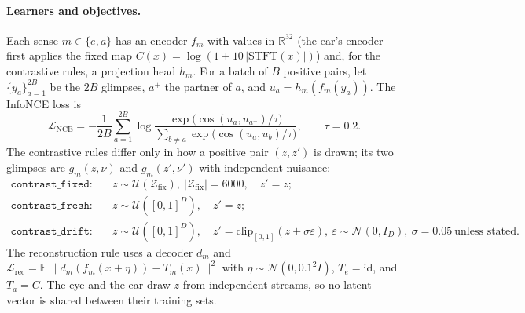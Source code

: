 \documentclass[11pt]{article}
\begin{document}
\paragraph{Learners and objectives.} Each sense $m\in\{e,a\}$ has an encoder $f_m$ with values in $\mathbb R^{32}$ (the ear's encoder first applies the fixed map $C(x)=\log(1+10\,\lvert\mathrm{STFT}(x)\rvert)$) and, for the contrastive rules, a projection head $h_m$. For a batch of $B$ positive pairs, let $\{y_a\}_{a=1}^{2B}$ be the $2B$ glimpses, $a^+$ the partner of $a$, and $u_a=h_m(f_m(y_a))$. The InfoNCE loss is
\begin{equation}
  \mathcal L_{\mathrm{NCE}}=-\frac{1}{2B}\sum_{a=1}^{2B}\log\frac{\exp\big(\cos(u_a,u_{a^+})/\tau\big)}{\sum_{b\neq a}\exp\big(\cos(u_a,u_b)/\tau\big)},\qquad \tau=0.2 .
\end{equation}
The contrastive rules differ only in how a positive pair $(z,z')$ is drawn; its two glimpses are $g_m(z,\nu)$ and $g_m(z',\nu')$ with independent nuisance:
\begin{align}
  \texttt{contrast\_fixed}:&\quad z\sim\mathcal U(\mathcal Z_{\mathrm{fix}}),\ \lvert\mathcal Z_{\mathrm{fix}}\rvert=6000,\quad z'=z;\\
  \texttt{contrast\_fresh}:&\quad z\sim\mathcal U([0,1]^D),\quad z'=z;\\
  \texttt{contrast\_drift}:&\quad z\sim\mathcal U([0,1]^D),\quad z'=\mathrm{clip}_{[0,1]}(z+\sigma\varepsilon),\ \varepsilon\sim\mathcal N(0,I_D),\ \sigma=0.05\ \text{unless stated}.
  \label{eq:drift}
\end{align}
The reconstruction rule uses a decoder $d_m$ and $\mathcal L_{\mathrm{rec}}=\mathbb E\,\lVert d_m(f_m(x+\eta))-T_m(x)\rVert^2$ with $\eta\sim\mathcal N(0,0.1^2 I)$, $T_e=\mathrm{id}$, and $T_a=C$. The eye and the ear draw $z$ from independent streams, so no latent vector is shared between their training sets.
\end{document}
